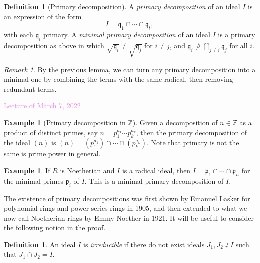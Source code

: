 \documentclass{amsart}[12pt]
\newcommand{\Mar}[1]{\textcolor{violet}{Lecture of March #1, 2022}}
\newcommand{\p}{{\mathfrak p}}
\newcommand{\q}{{\mathfrak q}}
\numberwithin{equation}{section}
\theoremstyle{plain} %
\theoremstyle{definition}
\newtheorem{defn}[equation]{Definition}
\newtheorem{definition}[equation]{Definition}
\newtheorem{ex}[equation]{Example}
\newtheorem{example}[equation]{Example}
\theoremstyle{remark}
\newtheorem{remark}[equation]{Remark}
\begin{document}
\begin{definition}[Primary decomposition]	
A {\em primary decomposition} of an ideal $I$ is an expression of the form 
	\[I = \q_1 \cap \cdots \cap \q_t,\] with each $\q_i$ primary. A {\em minimal primary decomposition} of an ideal $I$ is a primary decomposition as above in which $\sqrt{\q_i}\neq \sqrt{\q_j}$ for $i\neq j$, and $\q_i \not\supseteq \displaystyle\bigcap_{j\neq i} \q_j$ for all $i$.\end{definition}

\begin{remark} 
By the previous lemma, we can turn any primary decomposition into a minimal one by combining the terms with the same radical, then removing redundant terms.
\end{remark}

\Mar{7}

\begin{example}[Primary decomposition in $\mathbb{Z}$]
	Given a decomposition of $n \in \mathbb{Z}$ as a product of distinct primes, say $n = p_1^{a_1} \cdots p_k^{a_k}$, then the primary decomposition of the ideal $(n)$ is $(n) = (p_1^{a_1}) \cap \cdots \cap (p_k^{a_k})$. Note that primary is not the same is prime power in general.
\end{example}


\begin{ex} If $R$ is Noetherian and $I$ is a radical ideal, then $I=\p_1 \cap \cdots \cap \p_n$ for the minimal primes $\p_i$ of $I$. This is a minimal primary decomposition of $I$.
\end{ex}

The existence of primary decompositions was first shown by Emanuel Lasker for polynomial rings and power series rings in 1905, and then extended to what we now call Noetherian rings by Emmy Noether in 1921.  It will be useful to consider the following notion in the proof.

\begin{defn} An ideal $I$ is \emph{irreducible} if there do not exist ideals $J_1,J_2\supsetneqq I$ such that $J_1 \cap J_2 = I$.
\end{defn}
\end{document}
